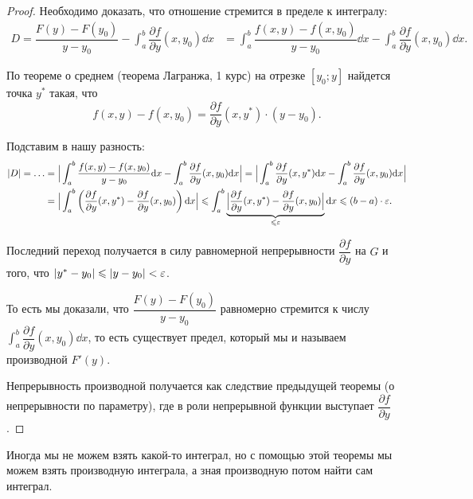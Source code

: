 \begin{proof}
    Необходимо доказать, что отношение стремится в пределе к интегралу:
    \begin{align*}
        D = \dfrac{F(y) - F(y_0)}{y - y_0} - \int_a^b \dfrac{\partial f}{\partial y} (x, y_0) \dd x
        &= \int_a^b \dfrac{f(x, y) - f(x, y_0)}{y - y_0} \dd x - \int_a^b \dfrac{\partial f}{\partial y} (x, y_0) \dd x.
    \end{align*}

    По теореме о среднем (теорема Лагранжа, 1 курс) на отрезке $[y_0; y]$ найдется точка $y^*$ такая, что
    \begin{equation*}
        f(x, y) - f(x, y_0) = \dfrac{\partial f}{\partial y} (x, y^*) \cdot (y - y_0).
    \end{equation*}

    Подставим в нашу разность:
    \begin{align*}
        |D| = \dots
        &= \Big|\int_a^b \dfrac{f(x, y) - f(x, y_0)}{y - y_0} \dd x - \int_a^b \dfrac{\partial f}{\partial y} (x, y_0) \dd x \Big| 
        = \Big|\int_a^b \dfrac{\partial f}{\partial y}(x, y^*) \dd x - \int_a^b \dfrac{\partial f}{\partial y} (x, y_0) \dd x \Big|\\
        &= \Big|\int_a^b \left(\dfrac{\partial f}{\partial y}(x, y^*) - \dfrac{\partial f}{\partial y} (x, y_0) \right) \dd x \Big|
        \leqslant \int_a^b \underbrace{\Big|\dfrac{\partial f}{\partial y}(x, y^*) - \dfrac{\partial f}{\partial y} (x, y_0) \Big|}_{\leqslant \varepsilon} \dd x
        \leqslant (b - a) \cdot \varepsilon.
    \end{align*}

    Последний переход получается в силу равномерной непрерывности $\dfrac{\partial f}{\partial y}$ на $G$ и того, что $|y^* - y_0| \leqslant |y - y_0| < \varepsilon$.

    То есть мы доказали, что $\dfrac{F(y) - F(y_0)}{y - y_0}$ равномерно стремится к числу $\int_a^b \dfrac{\partial f}{\partial y} (x, y_0) \dd x$, то есть существует предел, который мы и называем производной $F'(y)$.

    Непрерывность производной получается как следствие предыдущей теоремы (о непрерывности по параметру), где в роли непрерывной функции выступает $\dfrac{\partial f}{\partial y}$.
\end{proof}

Иногда мы не можем взять какой-то интеграл, но с помощью этой теоремы мы можем взять производную интеграла, а зная производную потом найти сам интеграл.

